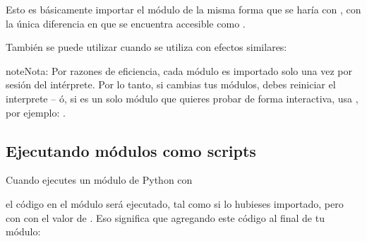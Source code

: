 \documentclass[a4,10pt,spanish]{sphinxmanual}
\begin{document}
\sphinxAtStartPar
Esto es básicamente importar el módulo de la misma forma que se haría con , con la única diferencia en que se encuentra accesible como .

\sphinxAtStartPar
También se puede utilizar cuando se utiliza  con efectos similares:

\begin{sphinxVerbatim}[commandchars=\\\{\}]
     
\end{sphinxVerbatim}

\begin{sphinxadmonition}{note}{Nota:}
\sphinxAtStartPar
Por razones de eficiencia, cada módulo es importado solo una vez por sesión del intérprete. Por lo tanto, si cambias tus módulos, debes reiniciar el interprete – ó, si es un solo módulo que quieres probar de forma interactiva, usa , por ejemplo: .
\end{sphinxadmonition}


\subsection{Ejecutando módulos como scripts}
\label{\detokenize{tutorial/modules:executing-modules-as-scripts}}\label{\detokenize{tutorial/modules:tut-modulesasscripts}}
\sphinxAtStartPar
Cuando ejecutes un módulo de Python con

\begin{sphinxVerbatim}[commandchars=\\\{\}]
  
\end{sphinxVerbatim}

\sphinxAtStartPar
el código en el módulo será ejecutado, tal como si lo hubieses importado, pero con  con el valor de .  Eso significa que agregando este código al final de tu módulo:

\begin{sphinxVerbatim}[commandchars=\\\{\}]
   
     
    \PYG{p}{[}\PYG{p}{]}
\end{sphinxVerbatim}
\end{document}
